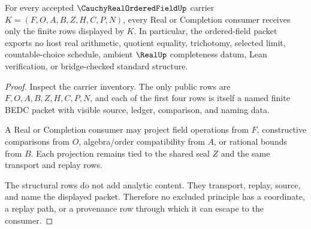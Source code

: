 \begin{theorem}
\label{thm:cauchy-real-ordered-field-nonescape}
For every accepted $\CauchyRealOrderedFieldUp$ carrier $K=(F,O,A,B,Z,H,C,P,N)$, every Real or Completion consumer receives only the finite rows displayed by $K$. In particular, the ordered-field packet exports no host real arithmetic, quotient equality, trichotomy, selected limit, countable-choice schedule, ambient $\RealUp$ completeness datum, Lean verification, or bridge-checked standard structure.
\end{theorem}
\begin{proof}
Inspect the carrier inventory. The only public rows are $F,O,A,B,Z,H,C,P,N$, and each of the first four rows is itself a named finite BEDC packet with visible source, ledger, comparison, and naming data.

A Real or Completion consumer may project field operations from $F$, constructive comparisons from $O$, algebra/order compatibility from $A$, or rational bounds from $B$. Each projection remains tied to the shared seal $Z$ and the same transport and replay rows.

The structural rows do not add analytic content. They transport, replay, source, and name the displayed packet. Therefore no excluded principle has a coordinate, a replay path, or a provenance row through which it can escape to the consumer.
\end{proof}

\begin{closurestatus}{\CauchyRealOrderedFieldUp}
  \theoryclosure{\seedClosure}
  \formalstatus{\unformalizedV}
\end{closurestatus}
